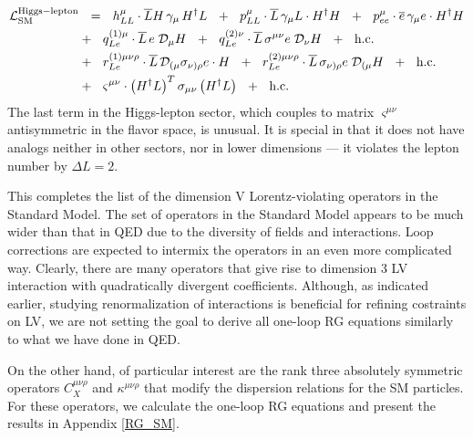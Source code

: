 \documentclass[12pt,preprintnumbers,nofootinbib]{revtex4}
\newcommand{\ov}{\overline}
\newcommand{\md}{\mathcal{D}}
\begin{document}
\begin{align}
\notag
	\mathcal{L}_{\rm SM}^{\rm Higgs-lepton} & ~~=~~
	h^{\mu}_{LL} \cdot
	\ov{L}H \, \gamma_\mu\, H^\dag L ~~+~~
	p_{LL}^\mu \cdot
	\ov{L}\, \gamma_\mu L \cdot H^\dag H ~~+~~
	p_{ee}^\mu \cdot
	\ov{e}\, \gamma_\mu e \cdot H^\dag H 
	\\
\label{Higgs_lepton}
	&
	+~~
	q^{(1)\mu}_{Le} \cdot
	\ov{L}\, e \; \md_\mu H ~~+~~
	q^{(2)\nu}_{Le} \cdot
	\ov{L}\, \sigma^{\mu\nu} e\; \md_\nu H ~~+~~
	\text{h.c.}
	\\
\notag
	&
	+~~
	r^{(1)\mu\nu\rho}_{Le} \cdot
	\ov{L}\, \md_{(\mu} \sigma_{\nu)\rho} e \cdot H ~~+~~
	r^{(2)\mu\nu\rho}_{Le} \cdot
	\ov{L}\, \sigma_{\nu)\rho} e \; \md_{(\mu} H ~~+~~
	\text{h.c.}
	\\
\notag
	&
	+~~
	\varsigma^{\mu\nu} \cdot
	\left( H^\dag L \right)^T \sigma_{\mu\nu} \left( H^\dag L \right)
	~~+~~
	\text{h.c.}
\end{align}
	The last term in the Higgs-lepton sector, which couples to 
	matrix $ \varsigma^{\mu\nu} $ antisymmetric in the flavor space, is unusual.
	It is special in that it does not have analogs neither in other sectors, 
	nor in lower dimensions --- it violates the lepton number by $ \Delta L = 2 $.

	This completes the list of the dimension V Lorentz-violating
	operators in the Standard Model.
	The set of operators in the Standard Model appears to be much
	wider than that in QED due to the diversity of fields and interactions.
	Loop corrections are expected to intermix the operators in an 
	even more complicated way. Clearly, there are many operators that give rise 
	to dimension 3 LV interaction with quadratically divergent coefficients. 
	Although, as indicated earlier, studying renormalization of interactions
	is beneficial for refining costraints on LV,
	we are not setting the goal to derive all one-loop RG
	equations similarly to what we have done in QED.

	On the other hand, of particular interest are
	the rank three absolutely
	symmetric operators $ C_X^{\mu\nu\rho} $ 
	and $ \kappa^{\mu\nu\rho} $ that modify the dispersion relations for the SM particles.
	For these operators, we calculate the one-loop RG equations and present 
the results in Appendix \ref{RG_SM}.
\end{document}

